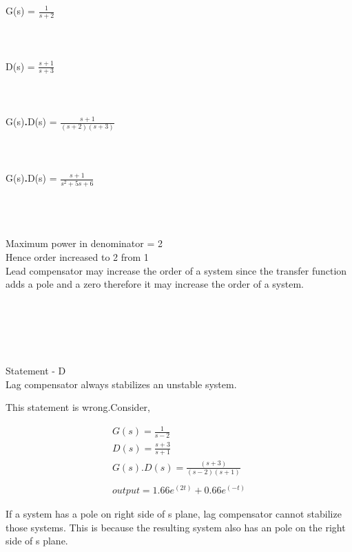 \begin{enumerate}[label=\thesection.\arabic*.,ref=\thesection.\theenumi]
\centering
G(s) = $\frac{1}{s+2}$\\
\\
\\
\\
D(s) = $\frac{s+1}{s+3}$\\
\\
\\
\\
G(s)\textbf{.}D(s) = $\frac{s+1}{(s+2)(s+3)}$\\
\\
\\
\\
G(s)\textbf{.}D(s) = $\frac{s+1}{s^2+5s+6}$\\
\\
\\
\\
\begin{flushleft}
Maximum power in denominator = 2\\
Hence order increased to 2 from 1\\
Lead compensator may increase the order of a system
since the transfer function adds a pole and a zero therefore it may increase the order of a system.\\
\end{flushleft}
\\
\\
\\
\\
\begin{flushleft}
Statement - D\\ Lag compensator always stabilizes an unstable system.
\begin{flushleft}
This statement is wrong.Consider,\\
\end{flushleft}
\begin{align}
G(s) = \frac{1}{s-2}\\
D(s) = \frac{s+3}{s+1}\\
G(s)\textbf{.}D(s) = \frac{(s+3)}{(s-2)(s+1)}\\ \\
output = 1.66e^{(2t)} + 0.66e^{(-t)}
\end{align}
\begin{flushleft}
If a system has a pole on right side of s plane, lag compensator cannot stabilize those systems. This is because the resulting system also has an pole on the right side of s plane.
\end{flushleft}


\textbf{}\begin{figure}[h]
 

\end{figure}
\end{flushleft}
\end{enumerate}
